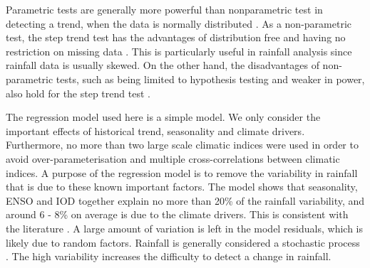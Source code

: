 \documentclass[draft,linenumbers]{agujournal}
\begin{document}
\begin{article}
Parametric tests are generally more powerful than nonparametric test in detecting a trend, when the data is normally distributed \citep{Onoz2003,Kundzewicz2004}. As a non-parametric test, the step trend test has the advantages of distribution free and having no restriction on missing data \citep{Hirsch1985}. This is particularly useful in rainfall analysis since rainfall data is usually skewed. On the other hand, the disadvantages of non-parametric tests, such as being limited to hypothesis testing and weaker in power, also hold for the step trend test \citep{Whitley2002}. 

The regression model used here is a simple model. We only consider the important effects of historical trend, seasonality and climate drivers. Furthermore, no more than two large scale climatic indices were used in order to avoid over-parameterisation and multiple cross-correlations between climatic indices. A purpose of the regression model is to remove the variability in rainfall that is due to these known important factors. The model shows that seasonality, ENSO and IOD together explain no more than 20\% of the rainfall variability, and around 6 - 8\% on average is due to the climate drivers. This is consistent with the literature \citep[e.g.][]{Westra2010}. A large amount of variation is left in the model residuals, which is likely due to random factors. Rainfall is generally considered a stochastic process \citep[e.g.][]{Fowler2005,Cowpertwait2009,Burton2010}. The high variability increases the difficulty to detect a change in rainfall. 


\end{article}
\end{document}
